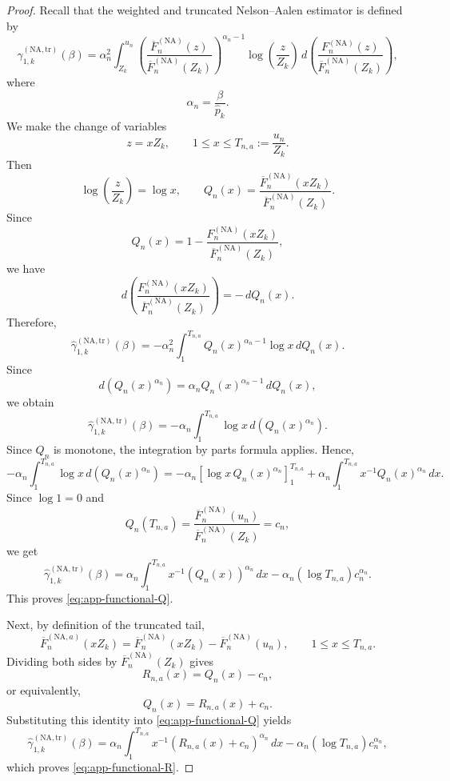\documentclass[reqno,openbib,runningheads,a4paper,12pt]{amsart}%
\begin{document}
\begin{proof}
Recall that the weighted and truncated Nelson--Aalen estimator is defined by
\[
\widehat{\gamma}_{1,k}^{(\mathrm{NA,tr})}(\beta) = \alpha_{n}^{2} \int_{Z_{k}%
}^{u_{n}} \left(  \frac{\overline{F}_{n}^{(\mathrm{NA})}(z)} {\overline{F}%
_{n}^{(\mathrm{NA})}(Z_{k})} \right)  ^{\alpha_{n}-1} \log\!\left(  \frac
{z}{Z_{k}}\right)  \,d\!\left(  \frac{F_{n}^{(\mathrm{NA})}(z)} {\overline
{F}_{n}^{(\mathrm{NA})}(Z_{k})} \right)  ,
\]
where
\[
\alpha_{n}=\frac{\beta}{\widehat{p}_{k}}.
\]
We make the change of variables
\[
z=xZ_{k},\qquad1\leq x\leq T_{n,a}:=\frac{u_{n}}{Z_{k}}.
\]
Then
\[
\log\!\left(  \frac{z}{Z_{k}}\right)  =\log x, \qquad Q_{n}(x)= \frac
{\overline{F}_{n}^{(\mathrm{NA})}(xZ_{k})} {\overline{F}_{n}^{(\mathrm{NA}%
)}(Z_{k})}.
\]
Since
\[
Q_{n}(x) = 1- \frac{F_{n}^{(\mathrm{NA})}(xZ_{k})} {\overline{F}%
_{n}^{(\mathrm{NA})}(Z_{k})},
\]
we have
\[
d\!\left(  \frac{F_{n}^{(\mathrm{NA})}(xZ_{k})} {\overline{F}_{n}%
^{(\mathrm{NA})}(Z_{k})} \right)  = -\,dQ_{n}(x).
\]
Therefore,
\[
\widehat{\gamma}_{1,k}^{(\mathrm{NA,tr})}(\beta) = -\alpha_{n}^{2} \int%
_{1}^{T_{n,a}} Q_{n}(x)^{\alpha_{n}-1}\log x\,dQ_{n}(x).
\]
Since
\[
d\!\left(  Q_{n}(x)^{\alpha_{n}}\right)  = \alpha_{n}Q_{n}(x)^{\alpha_{n}%
-1}\,dQ_{n}(x),
\]
we obtain
\[
\widehat{\gamma}_{1,k}^{(\mathrm{NA,tr})}(\beta) = -\alpha_{n} \int%
_{1}^{T_{n,a}} \log x\,d\!\left(  Q_{n}(x)^{\alpha_{n}}\right)  .
\]
Since $Q_{n}$ is monotone, the integration by parts formula applies. Hence,
\[
-\alpha_{n} \int_{1}^{T_{n,a}} \log x\,d\!\left(  Q_{n}(x)^{\alpha_{n}%
}\right)  = -\alpha_{n} \left[  \log x\,Q_{n}(x)^{\alpha_{n}} \right]
_{1}^{T_{n,a}} + \alpha_{n} \int_{1}^{T_{n,a}} x^{-1}Q_{n}(x)^{\alpha_{n}%
}\,dx.
\]
Since $\log1=0$ and
\[
Q_{n}(T_{n,a}) = \frac{\overline{F}_{n}^{(\mathrm{NA})}(u_{n})} {\overline
{F}_{n}^{(\mathrm{NA})}(Z_{k})} = c_{n},
\]
we get
\[
\widehat{\gamma}_{1,k}^{(\mathrm{NA,tr})}(\beta) = \alpha_{n} \int%
_{1}^{T_{n,a}} x^{-1}\left(  Q_{n}(x)\right)  ^{\alpha_{n}}\,dx - \alpha
_{n}(\log T_{n,a})c_{n}^{\alpha_{n}}.
\]
This proves \eqref{eq:app-functional-Q}.\smallskip

\noindent Next, by definition of the truncated tail,
\[
\overline{F}_{n}^{(\mathrm{NA},a)}(xZ_{k}) = \overline{F}_{n}^{(\mathrm{NA}%
)}(xZ_{k}) - \overline{F}_{n}^{(\mathrm{NA})}(u_{n}), \qquad1\leq x\leq
T_{n,a}.
\]
Dividing both sides by $\overline{F}_{n}^{(\mathrm{NA})}(Z_{k})$ gives
\[
R_{n,a}(x)=Q_{n}(x)-c_{n},
\]
or equivalently,
\[
Q_{n}(x)=R_{n,a}(x)+c_{n}.
\]
Substituting this identity into \eqref{eq:app-functional-Q} yields
\[
\widehat{\gamma}_{1,k}^{(\mathrm{NA,tr})}(\beta) = \alpha_{n} \int%
_{1}^{T_{n,a}} x^{-1}\left(  R_{n,a}(x)+c_{n}\right)  ^{\alpha_{n}}\,dx -
\alpha_{n}(\log T_{n,a})c_{n}^{\alpha_{n}},
\]
which proves \eqref{eq:app-functional-R}.\smallskip


\end{proof}
\end{document}
